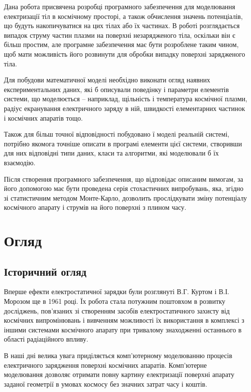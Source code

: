 \documentclass[a4paper,12pt]{article}
\begin{document}
Дана робота присвячена розробці програмного забезпечення для моделювання електризації тіл в космічному просторі, а також обчислення значень потенціалів, що будуть накопичуватися на цих тілах або їх частинах. В роботі розглядається випадок струму частин плазми на поверхні незарядженого тіла, оскільки він є більш простим, але програмне забезпечення має бути розроблене таким чином, щоб мати можливість його розвинути для обробки випадку поверхні зарядженого тіла.

Для побудови математичної моделі необхідно виконати огляд наявних експериментальних даних, які б описували поведінку і параметри елементів системи, що моделюється -- наприклад, щільність і температура космічної плазми, радіус екранування електричного заряду в ній, швидкості елементарних частинок і космічних апаратів тощо.
 
Також для більш точної відповідності побудовано ї моделі реальній системі, потрібно якомога точніше описати в програмі елементи цієї системи, створивши для них відповідні типи даних, класи та алгоритми, які моделювали б їх взаємодію.

Після створення програмного забезпечення, що відповідає описаним вимогам, за його допомогою має бути проведена серія стохастичних випробувань, яка, згідно зі статистичним методом Монте-Карло, дозволить прослідкувати зміну потенціалу космічного апарату і струмів на його поверхні з плином часу.

\newpage

\section{Огляд}
\subsection{Історичний огляд}
Вперше ефекти електростатичної зарядки були розглянуті В.Г. Куртом і В.І. Морозом ще в 1961 році. Їх робота стала потужним поштовхом в розвитку досліджень, пов’язаних зі створенням засобів електростатичного захисту від космічних випромінювань і вивченням можливості їх використання в комплексі з іншими системами космічного апарату при тривалому знаходженні останнього в області радіаційного впливу.

В наші дні велика увага приділяється комп’ютерному моделюванню процесів електричного зарядження  поверхні космічних апаратів. Комп’ютерне моделювання дозволяє отримати повну картину електризації поверхні апарату заданої геометрії в умовах космосу без значних затрат часу і коштів.
\end{document}
